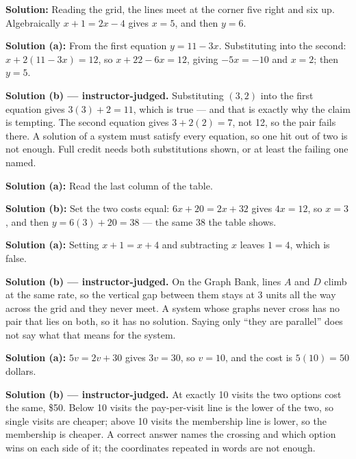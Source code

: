 \documentclass[12pt]{article}
\begin{document}

\textbf{Solution:} Reading the grid, the lines meet at the corner five right
and six up. Algebraically $x + 1 = 2x - 4$ gives $x = 5$, and then $y = 6$.


\textbf{Solution (a):} From the first equation $y = 11 - 3x$. Substituting
into the second: $x + 2(11 - 3x) = 12$, so $x + 22 - 6x = 12$, giving
$-5x = -10$ and $x = 2$; then $y = 5$. 

\textbf{Solution (b) --- instructor-judged.} Substituting $(3, 2)$ into the
first equation gives $3(3) + 2 = 11$, which is true --- and that is exactly
why the claim is tempting. The second equation gives $3 + 2(2) = 7$, not 12,
so the pair fails there. A solution of a system must satisfy every equation,
so one hit out of two is not enough. Full credit needs both substitutions
shown, or at least the failing one named.


\textbf{Solution (a):} Read the last column of the table. 

\textbf{Solution (b):} Set the two costs equal: $6x + 20 = 2x + 32$ gives
$4x = 12$, so $x = 3$, and then $y = 6(3) + 20 = 38$ --- the same 38 the table
shows. 


\textbf{Solution (a):} Setting $x + 1 = x + 4$ and subtracting $x$ leaves
$1 = 4$, which is false. 

\textbf{Solution (b) --- instructor-judged.} On the Graph Bank, lines $A$ and
$D$ climb at the same rate, so the vertical gap between them stays at 3 units
all the way across the grid and they never meet. A system whose graphs never
cross has no pair that lies on both, so it has no solution. Saying only ``they
are parallel'' does not say what that means for the system.


\textbf{Solution (a):} $5v = 2v + 30$ gives $3v = 30$, so $v = 10$, and the
cost is $5(10) = 50$ dollars. 

\textbf{Solution (b) --- instructor-judged.} At exactly 10 visits the two
options cost the same, \$50. Below 10 visits the pay-per-visit line is the
lower of the two, so single visits are cheaper; above 10 visits the membership
line is lower, so the membership is cheaper. A correct answer names the
crossing and which option wins on each side of it; the coordinates repeated in
words are not enough.
\end{document}
